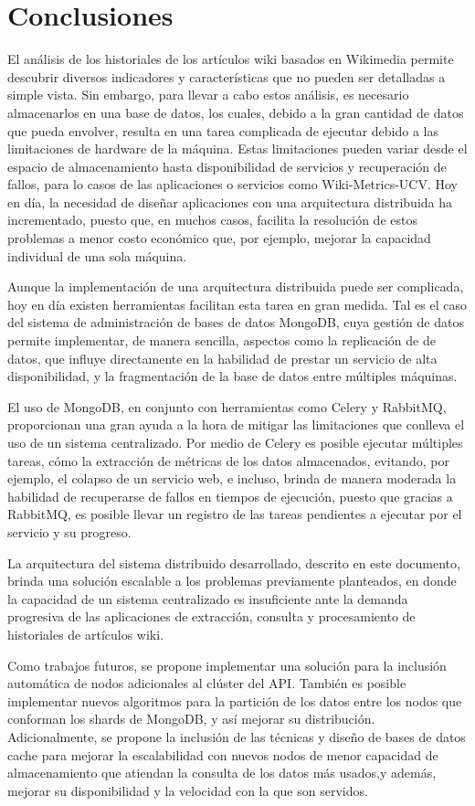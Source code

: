 \section{Conclusiones}

El análisis de los historiales de los artículos wiki basados en Wikimedia permite
descubrir diversos indicadores y características que no pueden ser detalladas a simple
vista.
Sin embargo, para llevar a cabo estos análisis, es necesario almacenarlos en una base
de datos, los cuales, debido a la gran cantidad de datos que pueda envolver, resulta
en una tarea complicada de ejecutar debido a las limitaciones de hardware de la
máquina.
Estas limitaciones pueden variar desde el espacio de almacenamiento hasta disponibilidad
de servicios y recuperación de fallos, para lo casos de las aplicaciones o servicios como
Wiki-Metrics-UCV.
Hoy en día, la necesidad de diseñar aplicaciones con una arquitectura distribuida
ha incrementado, puesto que, en muchos casos, facilita la resolución de estos problemas
a menor costo económico que, por ejemplo, mejorar la capacidad individual de una sola máquina.

Aunque la implementación de una arquitectura distribuida puede ser complicada,
hoy en día existen herramientas facilitan esta tarea en gran medida.
Tal es el caso del sistema de administración de bases de datos MongoDB, cuya gestión
de datos permite implementar, de manera sencilla, aspectos como la replicación de
de datos, que influye directamente en la habilidad de prestar un servicio de alta disponibilidad,
y la fragmentación de la base de datos entre múltiples máquinas.

El uso de MongoDB, en conjunto con herramientas como Celery y RabbitMQ, proporcionan
una gran ayuda a la hora de mitigar las limitaciones que conlleva el uso de un sistema centralizado.
Por medio de Celery es posible ejecutar múltiples tareas, cómo la extracción de métricas de los
datos almacenados, evitando, por ejemplo, el colapso de un servicio web, e incluso, brinda
de manera moderada la habilidad de recuperarse de fallos en tiempos de ejecución, puesto que gracias a RabbitMQ,
es posible llevar un registro de las tareas pendientes a ejecutar por el servicio y su progreso.

La arquitectura del sistema distribuido desarrollado, descrito en este documento, brinda
una solución escalable a los problemas previamente planteados, en donde la capacidad
de un sistema centralizado es insuficiente ante la demanda progresiva de las aplicaciones de
extracción, consulta y procesamiento de historiales de artículos wiki.

Como trabajos futuros, se propone implementar una solución para la inclusión automática de nodos adicionales al clúster del API.
También es posible implementar nuevos algoritmos para la partición de los datos entre los nodos que conforman los shards de MongoDB, y así mejorar su distribución.
Adicionalmente, se propone la inclusión de las técnicas y diseño de bases de datos cache para mejorar la escalabilidad con nuevos nodos de menor capacidad de almacenamiento que atiendan la consulta de los datos más usados,y además, mejorar su disponibilidad y la velocidad con la que son servidos.
